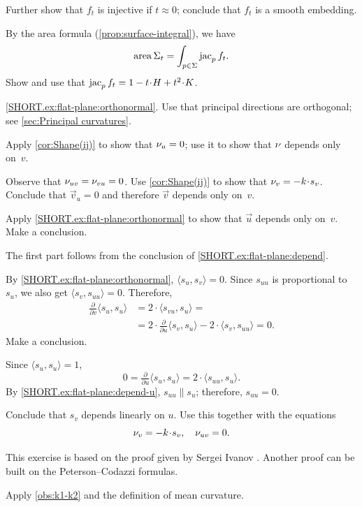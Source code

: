 Further show that $f_t$ is injective if $t\approx0$;
conclude that $f_t$ is a smooth embedding.

 By the area formula (\ref{prop:surface-integral}), we have
\[\mathop{\rm area}\nolimits\Sigma_t=\int_{p\in \Sigma}\mathop{\rm jac}\nolimits_pf_t.\]
Show and use that $\jac_pf_t=1-t\cdot H+t^2\cdot K$.

\parbf{\ref{ex:flat-plane};} \ref{SHORT.ex:flat-plane:orthonormal}.
Use that principal directions are orthogonal; see \ref{sec:Principal curvatures}.

Apply \ref{cor:Shape(ij)} to show that $\nu_u=0$; use it to show that $\nu$ depends only on~$v$.

Observe that $\nu_{uv}=\nu_{vu}=0$.
Use \ref{cor:Shape(ij)} to show that $\Norm_v=-k \cdot s_v$.
Conclude that $\vec v_u=0$ and therefore $\vec v$ depends only on~$v$.

Apply \ref{SHORT.ex:flat-plane:orthonormal} to show that $\vec u$ depends only on~$v$.
Make a conclusion.

The first part follows from the conclusion of \ref{SHORT.ex:flat-plane:depend}.

By \ref{SHORT.ex:flat-plane:orthonormal}, $\langle s_u,s_v\rangle=0$.
Since $s_{uu}$ is proportional to $s_u$, we also get $\langle s_{v},s_{uu}\rangle=0$.
Therefore,
\begin{align*}
\tfrac{\partial}{\partial v}\langle s_u,s_u\rangle&=2\cdot \langle s_{vu},s_u\rangle=
\\
&=2\cdot \tfrac{\partial}{\partial u}\langle s_v,s_u\rangle-2\cdot \langle s_{v},s_{uu}\rangle=0.
\end{align*}
Make a conclusion.

Since $\langle s_u,s_u\rangle=1$,
\[0=\tfrac{\partial}{\partial u}\langle s_u,s_u\rangle=2\cdot\langle s_{uu},s_u\rangle.\]
By \ref{SHORT.ex:flat-plane:depend-u}, $s_{uu}\parallel s_u$; therefore, $s_{uu}=0$.

Conclude that $s_v$ depends linearly on $u$.
Use this together with the equations
\[\Norm_v=-k\cdot s_v,\quad \Norm_{uv}=0.\]

This exercise is based on the proof given by Sergei Ivanov \cite[3$^\text{d}$ Sem. Lect. 13]{ivanov}.
Another proof can be built on the Peterson--Codazzi formulas.

Apply \ref{obs:k1-k2} and the definition of mean curvature.

